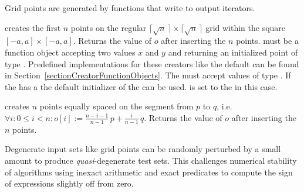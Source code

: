 
Grid points are generated by functions that write to output iterators.

\def\ccLongParamLayout{\ccTrue}
{ creates the first $n$ points on the regular $\lceil\sqrt{n}\,\rceil
    \times \lceil  \sqrt{n}\,\rceil$ grid within the square
    $[-a,a]\times [-a,a]$. Returns the value of $o$ after inserting
    the $n$ points. 
    \ccPrecond {} must be a function object accepting two
     values $x$ and $y$ and returning an initialized point
     of type . Predefined implementations for these
    creators like the default can be found in
    Section~\ref{sectionCreatorFunctionObjects}. The
     must accept values of type . If the
     has a  the default
    initializer of the  can be used.  is set to
    the  in this case.}
\def\ccLongParamLayout{\ccFalse}


{ creates $n$ points equally spaced on the segment from $p$ to $q$,
    i.e.~$\forall i: 0 \le i < n: o[i] := \frac{n-i-1}{n-1}\, p +
    \frac{i}{n-1}\, q$. Returns the value of $o$ after inserting
    the $n$ points.}


Degenerate input sets like grid points can be randomly perturbed by a
small amount to produce {\em quasi}-degenerate test sets. This
challenges numerical stability of algorithms using inexact arithmetic and
exact predicates to compute the sign of expressions slightly off from zero.

